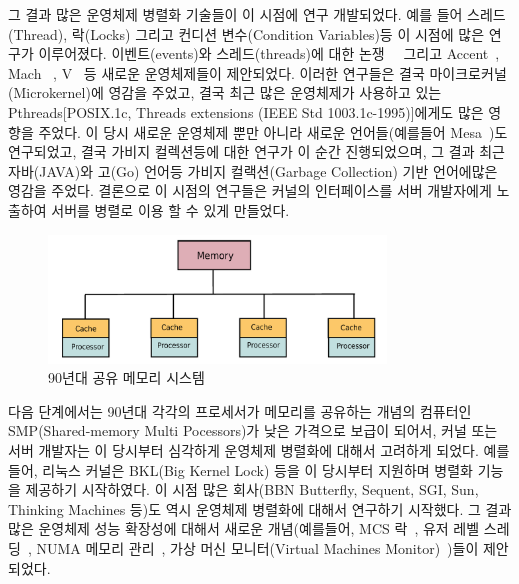 그 결과 많은 운영체제 병렬화 기술들이 이 시점에 연구 개발되었다. 
예를 들어 스레드(Thread), 락(Locks) 그리고 컨디션 변수(Condition Variables)등 이 시점에 많은 연구가 이루어졌다.
이벤트(events)와 스레드(threads)에 대한 논쟁~\cite{Ous96}~\cite{vonBehren2003WEB} 그리고
Accent~\cite{Rashid1981ACO}, Mach~\cite{Accetta86mach} , V~\cite{Cheriton1983DVK} 등 새로운 
운영체제들이 제안되었다. 
이러한 연구들은 결국 마이크로커널(Microkernel)에 영감을 주었고, 결국 최근 많은 운영체제가 사용하고 있는 
Pthreads[POSIX.1c, Threads extensions (IEEE Std 1003.1c-1995)]에게도 많은 영향을 주었다. 
이 당시 새로운 운영체제 뿐만 아니라 새로운 언어들(예를들어 Mesa~\cite{Lampson1979EPM})도 
연구되었고, 결국 가비지 컬렉션등에 대한 연구가 이 순간 진행되었으며, 그 결과 
최근 자바(JAVA)와 고(Go) 언어등 가비지 컬랙션(Garbage Collection) 기반 언어에많은 영감을 주었다.
결론으로 이 시점의 연구들은 커널의 인터페이스를 서버 개발자에게 노출하여 서버를 
병렬로 이용 할 수 있게 만들었다.

\begin{figure}[h!]
    \centering
    \includegraphics[width=0.8\textwidth]{fig/shared_memory}
    \caption{90년대 공유 메모리 시스템}
  \label{shared_memory}
\end{figure}

다음 단계에서는 90년대 각각의 프로세서가 메모리를 공유하는 개념의 컴퓨터인 SMP(Shared-memory Multi
Pocessors)가 낮은 가격으로 보급이 되어서, 커널 또는 서버 개발자는 이 당시부터 심각하게 
운영체제 병렬화에 대해서 고려하게 되었다.
예를 들어, 리눅스 커널은 BKL(Big Kernel Lock) 등을 이 당시부터 지원하며 병렬화 기능을 제공하기 시작하였다.
이 시점 많은 회사(BBN Butterfly, Sequent, SGI, Sun, Thinking Machines 등)도 역시 운영체제 병렬화에
대해서 연구하기 시작했다.
그 결과 많은 운영체제 성능 확장성에 대해서 새로운 개념(예를들어, 
MCS 락~\cite{MellorCrummey1991MCS}, 유저 레벨 스레딩~\cite{Marsh1991FUT}, NUMA 메모리
관리~\cite{Bolosky1991NPR}, 가상 머신 모니터(Virtual Machines
Monitor)~\cite{Bugnion1997DRC})들이 제안되었다.  

